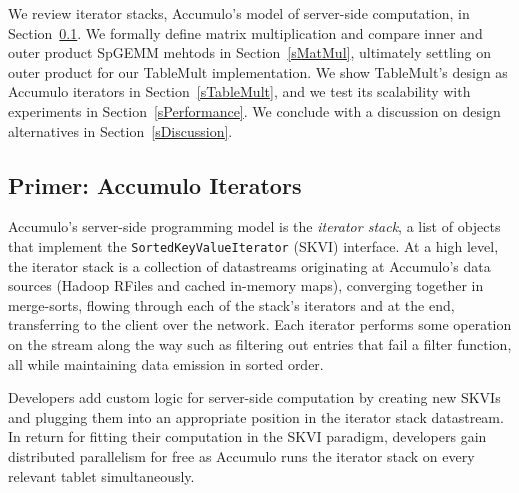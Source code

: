 
We review iterator stacks, Accumulo's model of server-side computation, in Section~\ref{sAccumuloIterators}.
We formally define matrix multiplication and compare inner and outer product SpGEMM mehtods
in Section~\ref{sMatMul}, ultimately settling on outer product for our TableMult implementation.
We show TableMult's design as Accumulo iterators in Section~\ref{sTableMult},
and we test its scalability with experiments in Section~\ref{sPerformance}.
We conclude with a discussion on design alternatives in Section~\ref{sDiscussion}.







\subsection{Primer: Accumulo Iterators}
\label{sAccumuloIterators}
Accumulo's server-side programming model is the %
\emph{iterator stack}, a list of objects that implement the \texttt{SortedKeyValueIterator} (SKVI) interface.
At a high level, the iterator stack is a collection of datastreams originating
at Accumulo's data sources (Hadoop RFiles and cached in-memory maps), converging together in merge-sorts,
flowing through each of the stack's iterators and at the end, transferring to the client over the network.
Each iterator performs some operation on the stream along the way such as filtering out entries that
fail a filter function, all while maintaining data emission in sorted order.

Developers add custom logic for server-side computation
by creating new SKVIs and plugging them into an appropriate position in the iterator stack datastream.
In return for fitting their computation in the SKVI paradigm, developers gain
distributed parallelism for free as Accumulo runs the iterator stack on every relevant tablet simultaneously.


